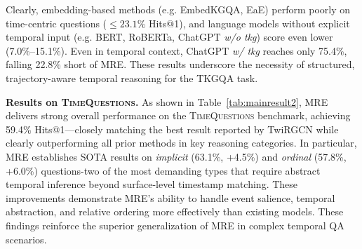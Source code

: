 \documentclass[letterpaper]{article} %
\begin{document}
Clearly, embedding-based methods (e.g. EmbedKGQA, EaE) perform poorly on time-centric questions ($\leq 23.1\%$ Hits@1), and language models without explicit temporal input (e.g. BERT, RoBERTa, ChatGPT \textit{w/o tkg}) score even lower (7.0\%--15.1\%). Even in temporal context, ChatGPT \textit{w/ tkg} reaches only 75.4\%, falling 22.8\% short of MRE. These results underscore the necessity of structured, trajectory-aware temporal reasoning for the TKGQA task.

\begin{table}[h]
	\centering
    \caption{Hits@1 for different question types.}
	\label{category}
\end{table}
\noindent\textbf{Results on \textsc{TimeQuestions}.}
As shown in Table~\ref{tab:mainresult2}, MRE delivers strong overall performance on the \textsc{TimeQuestions} benchmark, achieving 59.4\% Hits@1—closely matching the best result reported by TwiRGCN while clearly outperforming all prior methods in key reasoning categories. In particular, MRE establishes SOTA results on \textit{implicit} (63.1\%, +4.5\%) and \textit{ordinal} (57.8\%, +6.0\%) questions-two of the most demanding types that require abstract temporal inference beyond surface-level timestamp matching. These improvements demonstrate MRE’s ability to handle event salience, temporal abstraction, and relative ordering more effectively than existing models.
These findings reinforce the superior generalization of MRE in complex temporal QA scenarios.
\end{document}
